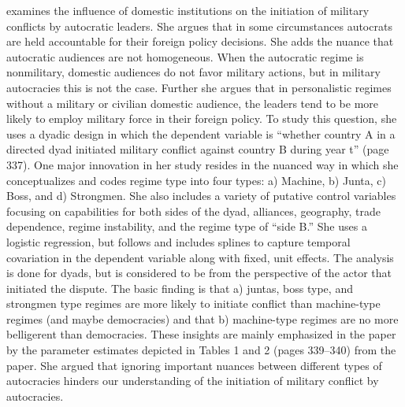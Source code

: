\citet{weeks:2012} examines the influence of domestic institutions on the initiation of military conflicts by autocratic leaders.  She argues that in some circumstances autocrats are held accountable for their foreign policy decisions. She adds the nuance that autocratic audiences are not homogeneous. When the autocratic regime is nonmilitary, domestic audiences do not favor military actions, but in military autocracies this is not the case. Further she argues that in personalistic regimes without a military or civilian domestic audience, the leaders tend to be more likely to employ military force in their foreign policy.  To study this question, she uses a dyadic design in which the dependent variable is ``whether country A in a directed dyad initiated military conflict against country B during year t'' (page 337).  One major innovation in her study resides in the nuanced way in which she conceptualizes and codes regime type into four types: a) Machine, b) Junta, c) Boss, and d) Strongmen. She also includes a variety of putative control variables focusing on capabilities for both sides of the dyad, alliances, geography, trade dependence, regime instability, and the regime type of ``side B.'' She uses a logistic regression, but follows \citet{beck:etal:1998} and includes splines to capture temporal covariation in the dependent variable along with fixed, unit effects. The analysis is done for dyads, but is considered to be from the perspective of the actor that initiated the dispute. The basic finding is that a) juntas, boss type, and strongmen type regimes are more likely to initiate conflict than machine-type regimes (and maybe democracies) and that b) machine-type regimes are no more belligerent than democracies.   These insights are mainly emphasized in the paper by the parameter estimates depicted in Tables 1 and 2 (pages 339--340) from the paper. She argued that ignoring important nuances between different types of autocracies hinders our understanding of the initiation of military conflict by autocracies. 

